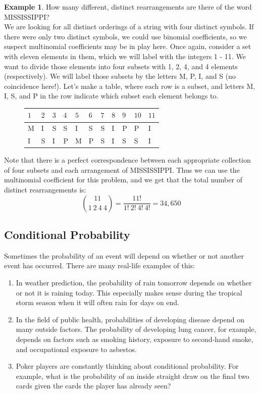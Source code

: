 \documentclass[12pt]{article}
\theoremstyle{definition}
\newtheorem*{example}{Example}
\theoremstyle{remark}
\begin{document}
\begin{example}How many different, distinct rearrangements are there of the word MISSISSIPPI?\\

We are looking for all distinct orderings of a string with four distinct symbols. If there were only two distinct symbols, we could use binomial coefficients, so we suspect multinomial coefficients may be in play here. Once again, consider a set with eleven elements in them, which we will label with the integers 1 - 11. We want to divide those elements into four subsets with 1, 2, 4, and 4 elements (respectively). We will label those subsets by the letters M, P, I, and S (no coincidence here!). Let's make a table, where each row is a subset, and letters M, I, S, and P in the row indicate which subset each element belongs to.

\begin{figure}[H]
\centering
\label{mississippi}
\begin{tabular}{lllllllllll}
$1$ & $2$ & $3$ & $4$ & $5$ & $6$ & $7$ & $8$ & $9$ & $10$ & $11$ \\
\hline
M & I & S & S & I & S & S & I & P & P & I \\
I & S & I & P & M & P & S & I & S & S & I \\
\end{tabular}
\end{figure} 

Note that there is a perfect correspondence between each appropriate collection of four subsets and each arrangement of MISSISSIPPI. Thus we can use the multinomial coefficient for this problem, and we get that the total number of distinct rearrangements is:
\[
\binom{11}{1 \: 2\: 4 \: 4} = \frac{11!}{1!\:2!\:4!\:4!} = 34,650
\]
\end{example}

\subsection{Conditional Probability}
Sometimes the probability of an event will depend on whether or not another event has occurred. There are many real-life examples of this:
\begin{enumerate}
\item In weather prediction, the probability of rain tomorrow depends on whether or not it is raining today. This especially makes sense during the tropical storm season when it will often rain for days on end.
\item In the field of public health, probabilities of developing disease depend on many outside factors. The probability of developing lung cancer, for example, depends on factors such as smoking history, exposure to second-hand smoke, and occupational exposure to asbestos.
\item Poker players are constantly thinking about conditional probability. For example, what is the probability of an inside straight draw on the final two cards given the cards the player has already seen?
\end{enumerate}
\end{document}
